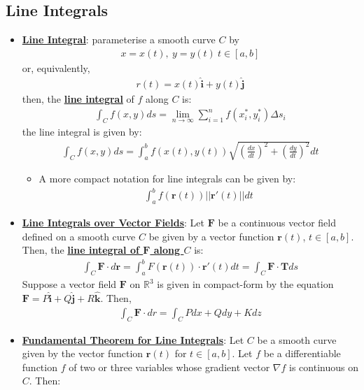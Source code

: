 \documentclass[reqno,11pt]{amsart}
\theoremstyle{definition}
\theoremstyle{remark}
\newcommand{\R}{\mathbb{R}}
\newcommand{\dfn}[1]{\underline{\textbf{#1}}}
\begin{document}
\subsection{Line Integrals}
\begin{itemize}[noitemsep]
	\item \dfn{Line Integral}: parameterise a smooth curve $C$ by
	\begin{align*}
		x = x(t),\ y = y(t)\ t \in [a,b] 
	\end{align*}
	or, equivalently, 
	\begin{align*}
		r(t) = x(t) \hat{\textbf{i}} + y(t) \hat{\textbf{j}} 
	\end{align*}
	then, the \dfn{line integral} of $f$ along $C$ is: 
	\begin{align}
		\int_C f(x,y) ds = \lim_{n \rightarrow \infty} \sum_{i=1}^n f(x_i^*, y_i^*) \Delta s_i 	
	\end{align}
	the line integral is given by: 
	\begin{align}
		\int_C f(x,y) ds = \int_a^b f(x(t), y(t)) \sqrt{\left( \frac{dx}{dt} \right)^2 + \left( \frac{dy}{dt} \right)^2 } dt 	
	\end{align}
	\begin{itemize}[noitemsep]
		\item A more compact notation for line integrals can be given by: 
		\begin{align}
			\int_a^b f(\mathbf{r}(t)) || \mathbf{r}'(t) || dt 	
		\end{align}
	\end{itemize}
	\item \dfn{Line Integrals over Vector Fields}: Let $\mathbf{F}$ be a continuous vector field defined on a smooth curve $C$ be given by a vector function $\mathbf{r}(t)$, $ t \in [a,b]$. Then, the \dfn{line integral of $\mathbf{F}$ along $C$} is: 
	\begin{align}
		\int_C \mathbf{F} \cdot d \mathbf{r} = \int_a^b F(\mathbf{r}(t)) \cdot \mathbf{r}'(t) dt = \int_C \mathbf{F} \cdot \mathbf{T} ds 	
	\end{align}
	Suppose a vector field $\mathbf{F}$ on $\R^3$ is given in compact-form by the equation $\mathbf{F} = P \hat{\mathbf{i}} + Q \hat{\mathbf{j}} + R \hat{\mathbf{k}} $. Then, 
	\begin{align}
		\int_C \mathbf{F} \cdot dr = \int_C P dx + Q dy + K dz 	
	\end{align}
	\item \dfn{Fundamental Theorem for Line Integrals}: Let $C$ be a smooth curve given by the vector function $\mathbf{r}(t)$ for $t \in [a,b]$. Let $f$ be a differentiable function $f$ of two or three variables whose gradient vector $\nabla f$ is continuous on $C$. Then:

\end{itemize}
\end{document}
